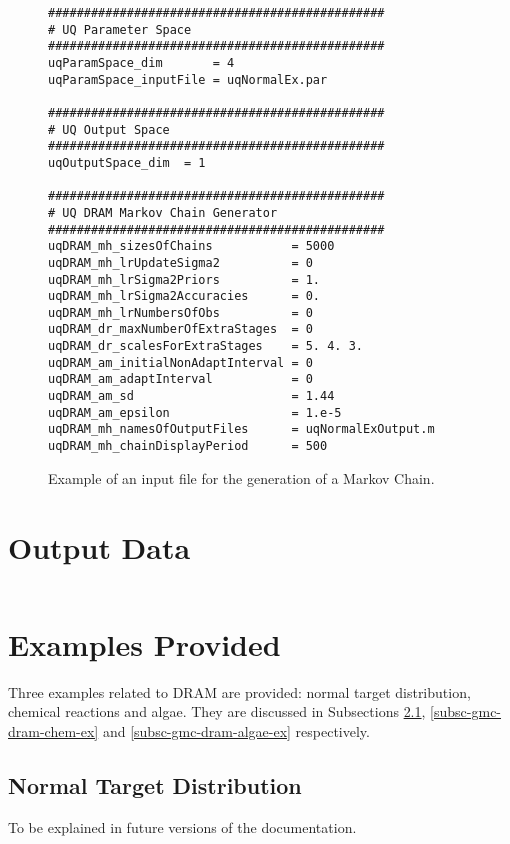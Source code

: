 \begin{figure}[h!]
\begin{verbatim}
###############################################
# UQ Parameter Space
###############################################
uqParamSpace_dim       = 4
uqParamSpace_inputFile = uqNormalEx.par

###############################################
# UQ Output Space
###############################################
uqOutputSpace_dim  = 1

###############################################
# UQ DRAM Markov Chain Generator
###############################################
uqDRAM_mh_sizesOfChains           = 5000
uqDRAM_mh_lrUpdateSigma2          = 0
uqDRAM_mh_lrSigma2Priors          = 1.
uqDRAM_mh_lrSigma2Accuracies      = 0.
uqDRAM_mh_lrNumbersOfObs          = 0
uqDRAM_dr_maxNumberOfExtraStages  = 0
uqDRAM_dr_scalesForExtraStages    = 5. 4. 3.
uqDRAM_am_initialNonAdaptInterval = 0
uqDRAM_am_adaptInterval           = 0
uqDRAM_am_sd                      = 1.44
uqDRAM_am_epsilon                 = 1.e-5
uqDRAM_mh_namesOfOutputFiles      = uqNormalExOutput.m
uqDRAM_mh_chainDisplayPeriod      = 500
\end{verbatim}
\caption{Example of an input file for the generation of a Markov Chain.
}
\label{fig-dram-input-file-ex}
\end{figure}

\section{Output Data}
$~$\\

\section{Examples Provided}\label{sc-gmc-dram-examples}

Three examples related to DRAM are provided: normal target distribution, chemical reactions and algae.
They are discussed in Subsections \ref{subsc-gmc-dram-normal-ex}, \ref{subsc-gmc-dram-chem-ex} and \ref{subsc-gmc-dram-algae-ex} respectively.

\subsection{Normal Target Distribution}\label{subsc-gmc-dram-normal-ex}

To be explained in future versions of the documentation.

